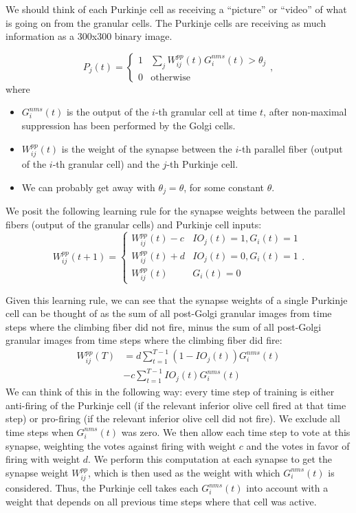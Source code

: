 \documentclass{article}
\theoremstyle{definition}
\begin{document}
We should think of each Purkinje cell as receiving a ``picture'' or
``video'' of what is going on from the granular cells. The Purkinje
cells are receiving as much information as a 300x300 binary image.

$$P_j(t) = \begin{cases} 1 & \sum_j W^{pp}_{ij}(t) G^{nms}_{i}(t) > \theta_j \\
0 & \mbox{otherwise} \end{cases},$$
where
\begin{itemize}
\item $G^{nms}_i(t)$ is the output of the $i$-th granular cell at time $t$,
  after non-maximal suppression has been performed by the Golgi cells.
\item $W^{pp}_{ij}(t)$ is the weight of the synapse between the $i$-th
  parallel fiber (output of the $i$-th granular cell) and the $j$-th
  Purkinje cell.
\item We can probably get away with $\theta_j=\theta$, for some
  constant $\theta$.
\end{itemize}


We posit the following learning rule for the synapse weights between
the parallel fibers (output of the granular cells) and Purkinje cell
inputs:
$$W^{pp}_{ij}(t+1) = \begin{cases} 
W^{pp}_{ij}(t) - c & IO_j(t)=1, G_{i}(t)=1 \\
W^{pp}_{ij}(t) + d & IO_j(t)=0, G_i(t)=1 \\
W^{pp}_{ij}(t) & G_i(t)=0 \end{cases}.$$

Given this learning rule, we can see that the synapse weights of a
single Purkinje cell can be thought of as the sum of all post-Golgi
granular images from time steps where the climbing fiber did not fire,
minus the sum of all post-Golgi granular images from time steps where
the climbing fiber did fire:
\begin{align*}
W^{pp}_{ij}(T) &= d\sum_{t=1}^{T-1} \left(1-IO_j(t)\right) G^{nms}_i(t) \\
& - c \sum_{t=1}^{T-1} IO_j(t) G^{nms}_i(t)
\end{align*}
We can think of this in the following way: every time step of training
is either anti-firing of the Purkinje cell (if the relevant inferior
olive cell fired at that time step) or pro-firing (if the relevant
inferior olive cell did not fire). We exclude all time steps when
$G^{nms}_i(t)$ was zero. We then allow each time step to vote at this
synapse, weighting the votes against firing with weight $c$ and the
votes in favor of firing with weight $d$. We perform this computation
at each synapse to get the synapse weight $W^{pp}_{ij}$, which is then
used as the weight with which $G^{nms}_i(t)$ is considered. Thus, the
Purkinje cell takes each $G^{nms}_i(t)$ into account with a weight
that depends on all previous time steps where that cell was active.
\end{document}
